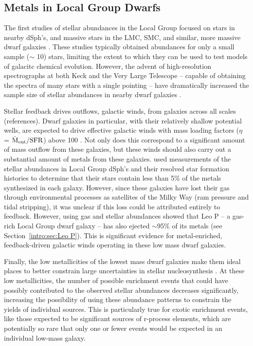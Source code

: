\subsection{Metals in Local Group Dwarfs}
\label{intro:sec:metals in LG}

The first studies of stellar abundances in the Local Group focused on stars in nearby dSph's, and massive stars in the LMC, SMC, and similar, more massive dwarf galaxies \citep[e.g.][]{}. These studies typically obtained abundances for only a small sample ($\sim$ 10) stars, limiting the extent to which they can be used to test models of galacitc chemical evolution.  However, the advent of high-resolution spectrographs at both Keck and the Very Large Telescope -- capable of obtaining the spectra of many stars with a single pointing -- have dramatically increased the sample size of stellar abundances in nearby dwarf galaxies \citep[e.g.][]{}.

Stellar feedback drives outflows, galactic winds, from galaxies across all scales (references). Dwarf galaxies in particular, with their relatively shallow potential wells, are expected to drive effective galactic winds \citep{MacLowFerrara1999} with mass loading factors ($\eta$ = $\dot{\rm{M}}_{\rm out} / {\rm SFR}$) above 100 \citep{Muratov2015,Christensen2018}. Not only does this correspond to a significant amount of mass outflow from these galaxies, but these winds should also carry out a substantial amount of metals from these galaxies. \cite{Kirby2011-metals} used measurements of the stellar abundances in Local Group dSph's and their resolved star formation histories to determine that their stars contain less than 5\% of the metals synthesized in each galaxy. However, since these galaxies have lost their gas through environmental processes as satellites of the Milky Way (ram pressure and tidal stripping), it was unclear if this loss could be attributed entirely to feedback. However, using gas and stellar abundances \cite{McQuinn2015} showed that Leo P -- a gas-rich Local Group dwarf galaxy -- has also ejected $\sim$95\% of its metals (see Section~\ref{intro:sec:Leo P}). This is significant evidence for metal-enriched, feedback-driven galactic winds operating in these low mass dwarf galaxies.

Finally, the low metallicities of the lowest mass dwarf galaxies make them ideal places to better constrain large uncertainties in stellar nucleosynthesis \citep{FrebelNorris2015,Frebel2018}. At these low metallicities, the number of possible enrichment events that could have possibly contributed to the observed stellar abundances decreases significantly, increasing the possibility of using these abundance patterns to constrain the yields of individual sources. This is particularly true for exotic enrichment events, like those expected to be significant sources of r-process elements, which are potentially so rare that only one or fewer events would be expected in an individual low-mass galaxy.

